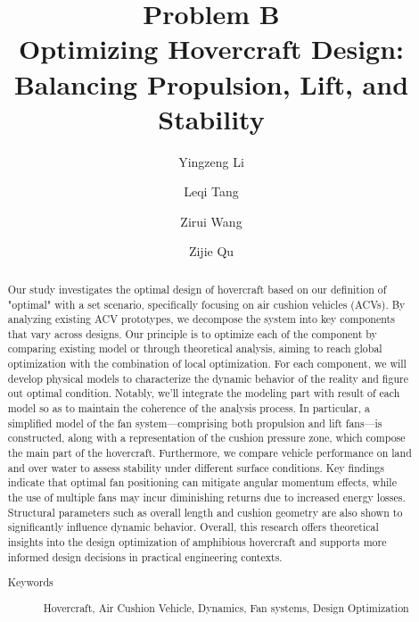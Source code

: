 



\title{Problem B\\ Optimizing Hovercraft Design: Balancing Propulsion, Lift, and Stability}

\author{Yingzeng Li}
\author{Leqi Tang}
\author{Zirui Wang}
\author{Zijie Qu}

\begin{abstract}
Our study investigates the optimal design of hovercraft based on our definition of "optimal" with a set scenario, specifically focusing on air cushion vehicles (ACVs). By analyzing existing ACV prototypes, we decompose the system into key components that vary across designs. Our principle is to optimize each of the component by comparing existing model or through theoretical analysis, aiming to reach global optimization with the combination of local optimization. For each component, we will develop physical models to characterize the dynamic behavior of the reality and figure out optimal condition. Notably, we'll integrate the modeling part with result of each model so as to maintain the coherence of the analysis process. In particular, a simplified model of the fan system—comprising both propulsion and lift fans—is constructed, along with a representation of the cushion pressure zone, which compose the main part of the hovercraft. Furthermore, we compare vehicle performance on land and over water to assess stability under different surface conditions. Key findings indicate that optimal fan positioning can mitigate angular momentum effects, while the use of multiple fans may incur diminishing returns due to increased energy losses. Structural parameters such as overall length and cushion geometry are also shown to significantly influence dynamic behavior.  Overall, this research offers theoretical insights into the design optimization of amphibious hovercraft and supports more informed design decisions in practical engineering contexts.

\begin{description}
    \item[Keywords] Hovercraft, Air Cushion Vehicle, Dynamics, Fan systems, Design Optimization
\end{description}

\end{abstract}

